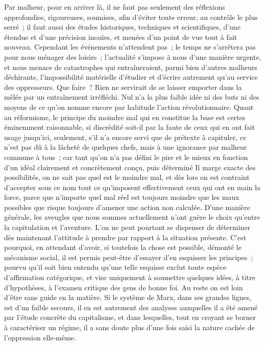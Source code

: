 \documentclass[french,twoside]{book} %
\begin{document}
Par malheur, pour en arriver là, il ne faut pas seulement des réflexions approfondies, rigoureuses, soumises, afin d'éviter toute erreur, au contrôle le plus serré ; il faut aussi des études historiques, techniques et scientifiques, d'une étendue et d'une précision inouïes, et menées d'un point de vue tout à fait nouveau. Cependant les événements n'attendent pas ; le temps ne s'arrêtera pas pour nous ménager des loisirs ; l'actualité s'impose à nous d'une manière urgente, et nous menace de catastrophes qui entraîneraient, parmi bien d'autres malheurs déchirants, l'impossibilité matérielle d'étudier et d'écrire autrement qu'au service des oppresseurs. Que faire ? Rien ne servirait de se laisser emporter dans la mêlée par un entraînement irréfléchi. Nul n’a la plus faible idée ni des buts ni des moyens de ce qu'on nomme encore par habitude l'action révolutionnaire. Quant au réformisme, le principe du moindre mal qui en constitue la base est certes éminemment raisonnable, si discrédité soit-il par la faute de ceux qui en ont fait usage jusqu'ici, seulement, s'il n'a encore servi que de prétexte à capituler, ce n'est pas dû à la lâcheté de quelques chefs, mais à une ignorance par malheur commune à tous ; car tant qu'on n'a pas défini le pire et le mieux en fonction d'un idéal clairement et concrètement conçu, puis déterminé Il marge exacte des possibilités, on ne sait pas quel est le moindre mal, et dès lors on est contraint d'accepter sous ce nom tout ce qu'imposent effectivement ceux qui ont en main la force, parce que n'importe quel mal réel est toujours moindre que les maux possibles que risque toujours d'amener une action non calculée. D'une manière générale, les aveugles que nous sommes actuellement n'ont guère le choix qu'entre la capitulation et l'aventure. L'on ne peut pourtant se dispenser de déterminer dès maintenant l'attitude à prendre par rapport à la situation présente. C'est pourquoi, en attendant d'avoir, si toutefois la chose est possible, démonté le mécanisme social, il est permis peut-être d'essayer d'en esquisser les principes ; pourvu qu'il soit bien entendu qu'une telle esquisse exclut toute espèce d'affirmation catégorique, et vise uniquement à soumettre quelques idées, à titre d'hypothèses, à l'examen critique des gens de bonne foi. Au reste on est loin d'être sans guide en la matière. Si le système de Marx, dans ses grandes lignes, est d'un faible secours, il en est autrement des analyses auxquelles il a été amené par l'étude concrète du capitalisme, et dans lesquelles, tout en croyant se borner à caractériser un régime, il a sans doute plus d'une fois saisi la nature cachée de l'oppression elle-même.\par
\end{document}
